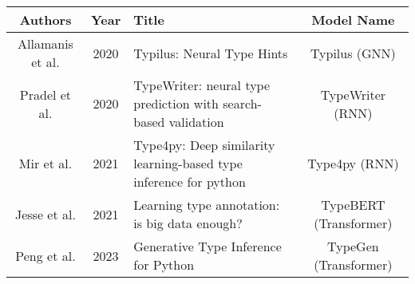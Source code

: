 \begin{tabularx}{\textwidth}{ccXc}
    \toprule
    Authors & Year & Title & Model Name \\
    \midrule
    Allamanis et al. & 2020 & Typilus: Neural Type Hints & Typilus (GNN) \\
    Pradel et al. & 2020 & TypeWriter: neural type prediction with search-based validation & TypeWriter (RNN) \\
    Mir et al. & 2021 & Type4py: Deep similarity learning-based type inference for python & Type4py (RNN) \\
    Jesse et al. & 2021 & Learning type annotation: is big data enough? & TypeBERT (Transformer) \\
    Peng et al. & 2023 & Generative Type Inference for Python & TypeGen (Transformer) \\
    \bottomrule
\end{tabularx}